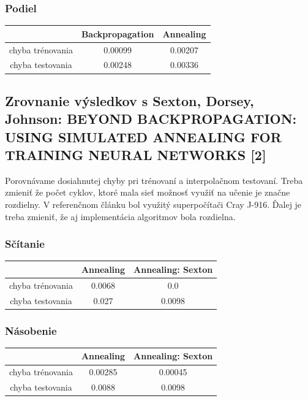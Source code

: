 \documentclass[11pt,a4paper]{article}
\begin{document}
\subsubsection{Podiel}
\begin{center}
\begin{tabular}{|c|c|c|}
\hline 
 & Backpropagation & Annealing \\ 
\hline 
chyba trénovania & 0.00099 & 0.00207 \\ 
\hline 
chyba testovania & 0.00248 & 0.00336 \\ 
\hline 
\end{tabular}
\end{center}
\subsection{Zrovnanie výsledkov s Sexton, Dorsey, Johnson: BEYOND BACKPROPAGATION: USING SIMULATED
ANNEALING FOR TRAINING NEURAL NETWORKS [2] }
Porovnávame dosiahnutej chyby pri trénovaní a interpolačnom testovaní. Treba zmieniť že počet cyklov, ktoré mala sieť možnosť využiť na učenie je značne rozdielny. V referenčnom článku bol využitý superpočítači Cray J-916. Ďalej je treba zmieniť, že aj implementácia algoritmov bola rozdielna. 
\subsubsection{Sčítanie}
\begin{center}
\begin{tabular}{|c|c|c|}
\hline 
 & Annealing & Annealing: Sexton\\ 
\hline 
chyba trénovania &  0.0068  & 0.0\\ 
\hline 
chyba testovania & 0.027 & 0.0098\\ 
\hline 
\end{tabular}
\end{center}

\subsubsection{Násobenie}
\begin{center}
\begin{tabular}{|c|c|c|}
\hline 
 & Annealing & Annealing: Sexton\\ 
\hline 
chyba trénovania & 0.00285  & 0.00045\\ 
\hline 
chyba testovania & 0.0088 & 0.0098\\ 
\hline 
\end{tabular}
\end{center}
\end{document}

